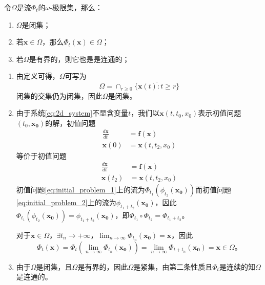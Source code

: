 \begin{prop}\label{prop:omega_limit_set}

    令$\Omega$是流$\Phi_t$的$\omega$-极限集，那么：
    \begin{enumerate}
        \item $\Omega$是闭集；
        \item 若$\mathbf{x}\in \Omega$，那么$\Phi_t(\mathbf{x})\in \Omega$；
        \item 若$\Omega$是有界的，则它也是是连通的；
    \end{enumerate}
\end{prop}
\begin{pf}

    \begin{enumerate}
        \item 由定义可得，$\Omega$可写为
              \begin{equation*}
                  \Omega=\cap_{r\geq 0}\overline{\{\mathbf{x}(t):t\geq r\}}
              \end{equation*}
              闭集的交集仍为闭集，因此$\Omega$是闭集。
        \item 由于系统\ref{eq:2d_system}不显含变量$t$，我们以$\mathbf{x}(t,t_0,x_0)$表示初值问题$(t_0,\mathbf{x_0})$的解，初值问题
              \begin{equation}\label{eq:initial_problem_1}
                  \begin{aligned}
                      \frac{d\mathbf{x}}{dt} & =\mathbf{f}(\mathbf{x}) \\
                      \mathbf{x}(0)          & =\mathbf{x}(t,t_2,x_0)
                  \end{aligned}
              \end{equation}
              等价于初值问题
              \begin{equation}\label{eq:initial_problem_2}
                  \begin{aligned}
                      \frac{d\mathbf{x}}{dt} & =\mathbf{f}(\mathbf{x}) \\
                      \mathbf{x}(t_2)        & =\mathbf{x}(t,t_2,x_0)
                  \end{aligned}
              \end{equation}
              初值问题\ref{eq:initial_problem_1}上的流为$\Phi_{t_1}(\phi_{t_2}(\mathbf{x_0}))$而初值问题\ref{eq:initial_problem_2}上的流为$\phi_{t_1+t_2}(\mathbf{x_0})$，因此$\Phi_{t_1}(\phi_{t_2}(\mathbf{x_0}))=\phi_{t_1+t_2}(\mathbf{x_0})$，即$\Phi_{t_1}\circ\Phi_{t_2}=\Phi_{t_1+t_2}$。

              对于$\mathbf{x}\in\Omega$，$\exists t_n\to +\infty$，$\lim_{n\to\infty}\Phi_{t_n}(\mathbf{x_0})=\mathbf{x}$，因此
              \begin{equation*}
                  \Phi_t(\mathbf{x})=\Phi_{t}(\lim_{n\to\infty}\Phi_{t_n}(\mathbf{x_0}))=\lim_{n\to\infty}\Phi_{t+t_n}(\mathbf{x_0})=\mathbf{x}\in \Omega。
              \end{equation*}
        \item 由于$\Omega$是闭集，且$\Omega$是有界的，因此$\Omega$是紧集，由第二条性质且$\Phi_t$是连续的知$\Omega$是连通的。
    \end{enumerate}
\end{pf}
